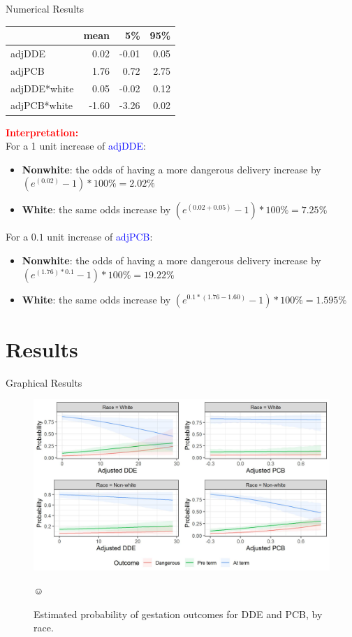 \documentclass{beamer}
\begin{document}
\begin{frame}{Numerical Results}
\begin{table}
\centering
\begin{tabular}{l|r|r|r}
\hline
  & mean & 5\% & 95\%\\
\hline
adjDDE & 0.02 & -0.01 & 0.05\\
\hline
adjPCB & 1.76 & 0.72 & 2.75\\
\hline
adjDDE*white & 0.05 & -0.02 & 0.12\\
\hline
adjPCB*white & -1.60 & -3.26 & 0.02\\
\hline
\end{tabular}
\end{table}
\medskip
\small
\textcolor{red}{\textbf{Interpretation:}}\\
For a 1 unit increase of \textcolor{blue}{adjDDE}: 
\begin{itemize}
\item \textbf{Nonwhite}: the odds of having a more dangerous delivery increase by $(e^{(0.02)}-1)*100\%=2.02\%$ 
\item \textbf{White}:  the same odds increase by $(e^{(0.02+0.05)}-1)*100\%=7.25\%$
\end{itemize}
For a $0.1$ unit increase of \textcolor{blue}{adjPCB}:
\begin{itemize}
\item \textbf{Nonwhite}: the odds of having a more dangerous delivery increase by $(e^{(1.76)*0.1}-1)*100\%=19.22\%$
\item \textbf{White}:  the same odds increase by $(e^{0.1*(1.76-1.60)}-1)*100\%=1.595\%$
\end{itemize}

\end{frame}
\section{Results}

\begin{frame}{Graphical Results}
\begin{figure}
	\centering
	\includegraphics[width=1\textwidth]{results.jpeg}
	\caption{Estimated probability of gestation outcomes for DDE and PCB, by race.}
	\label{fig:corrPCB}☺
\end{figure}

\end{frame}
\end{document}
